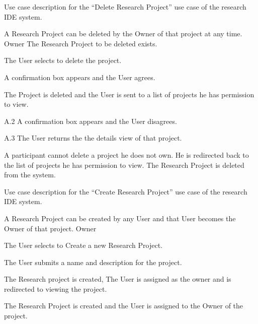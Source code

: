 \documentclass[document.tex]{subfiles}
\begin{document}
\begin{table}
  \centering
  \caption{Use case description for the ``Delete Research Project'' use case of the research IDE system.}
  \label{tbl:use-case-delete-research-project}

  \begin{usecase}
    A Research Project can be deleted by the Owner of that project at any time.
    Owner
    The Research Project to be deleted exists.
    \ucnormal
    \begin{ucenum}
      \item The User selects to delete the project.
      \item A confirmation box appears and the User agrees.
      \item The Project is deleted and the User is sent to a list of projects he has permission to view.
    \end{ucenum}
    \begin{ucenum}
      \item [A.2] A confirmation box appears and the User disagrees.
      \item [A.3] The User returns the the details view of that project.
    \end{ucenum}
    A participant cannot delete a project he does not own. He is redirected back to the list of projects he has permission to view.
    The Research Project is deleted from the system.
  \end{usecase}
\end{table}


\begin{table}
  \centering
  \caption{Use case description for the ``Create Research Project'' use case of the research IDE system.}
  \label{tbl:use-case-create-research-project}

  \begin{usecase}
    A Research Project can be created by any User and that User becomes the Owner of that project.
    Owner
    \ucnormal
    \begin{ucenum}
      \item The User selects to Create a new Research Project.
      \item The User submits a name and description for the project.
      \item The Research project is created, The User is assigned as the owner and is redirected to viewing the project.
    \end{ucenum}
    The Research Project is created and the User is assigned to the Owner of the project.
  \end{usecase}
\end{table}
\end{document}
